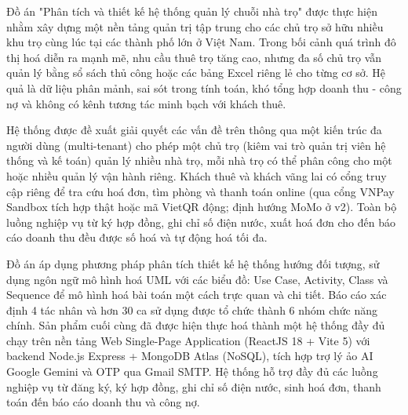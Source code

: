 
Đồ án "Phân tích và thiết kế hệ thống quản lý chuỗi nhà trọ" được thực
hiện nhằm xây dựng một nền tảng quản trị tập trung cho các chủ trọ sở
hữu nhiều khu trọ cùng lúc tại các thành phố lớn ở Việt Nam. Trong bối
cảnh quá trình đô thị hoá diễn ra mạnh mẽ, nhu cầu thuê trọ tăng cao,
nhưng đa số chủ trọ vẫn quản lý bằng sổ sách thủ công hoặc các bảng
Excel riêng lẻ cho từng cơ sở. Hệ quả là dữ liệu phân mảnh, sai sót
trong tính toán, khó tổng hợp doanh thu - công nợ và không có kênh tương
tác minh bạch với khách thuê.

Hệ thống được đề xuất giải quyết các vấn đề trên thông qua một kiến trúc
đa người dùng (multi-tenant) cho phép một chủ trọ (kiêm vai trò quản trị
viên hệ thống và kế toán) quản lý nhiều nhà trọ, mỗi nhà trọ có thể phân
công cho một hoặc nhiều quản lý vận hành riêng. Khách thuê và khách vãng
lai có cổng truy cập riêng để tra cứu hoá đơn, tìm phòng và thanh toán
online (qua cổng VNPay Sandbox tích hợp thật hoặc mã VietQR động; định
hướng MoMo ở v2). Toàn bộ luồng nghiệp vụ từ ký hợp đồng, ghi chỉ số
điện nước, xuất hoá đơn cho đến báo cáo doanh thu đều được số hoá và tự
động hoá tối đa.

Đồ án áp dụng phương pháp phân tích thiết kế hệ thống hướng đối tượng,
sử dụng ngôn ngữ mô hình hoá UML với các biểu đồ: Use Case, Activity,
Class và Sequence để mô hình hoá bài toán một cách trực quan và chi
tiết. Báo cáo xác định 4 tác nhân và hơn 30 ca sử dụng được tổ chức
thành 6 nhóm chức năng chính. Sản phẩm cuối cùng đã được hiện thực hoá
thành một hệ thống đầy đủ chạy trên nền tảng Web Single-Page Application
(ReactJS 18 + Vite 5) với backend Node.js Express + MongoDB Atlas
(NoSQL), tích hợp trợ lý ảo AI Google Gemini và OTP qua Gmail SMTP. Hệ
thống hỗ trợ đầy đủ các luồng nghiệp vụ từ đăng ký, ký hợp đồng, ghi chỉ
số điện nước, sinh hoá đơn, thanh toán đến báo cáo doanh thu và công nợ.

